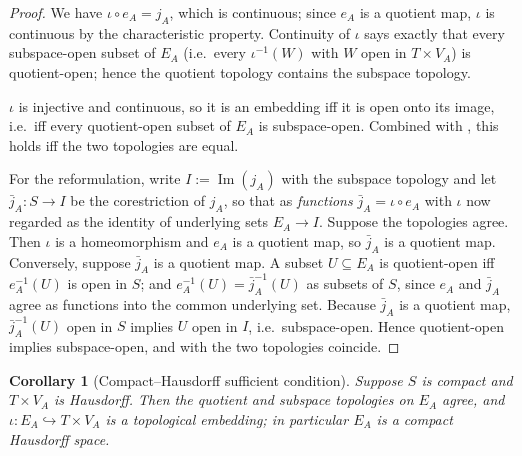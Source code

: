 \documentclass[11pt,reqno]{amsart}
\theoremstyle{plain}
\newtheorem{corollary}[theorem]{Corollary}
\theoremstyle{definition}
\theoremstyle{remark}
\numberwithin{equation}{section}
\DeclareMathOperator{\Image}{Im}
\begin{document}
\begin{proof}
 We have $\iota\circ e_A=j_A$, which is continuous; since $e_A$ is a quotient
map, $\iota$ is continuous by the characteristic property. Continuity of $\iota$ says exactly that
every subspace-open subset of $E_A$ (i.e.\ every $\iota^{-1}(W)$ with $W$ open in $T\times V_A$) is
quotient-open; hence the quotient topology contains the subspace topology.

 $\iota$ is injective and continuous, so it is an embedding iff it is open
onto its image, i.e.\ iff every quotient-open subset of $E_A$ is subspace-open. Combined with
, this holds iff the two topologies are equal.

For the reformulation, write $I:=\Image(j_A)$ with the subspace topology and let
$\bar j_A\colon S\to I$ be the corestriction of $j_A$, so that as \emph{functions}
$\bar j_A=\iota\circ e_A$ with $\iota$ now regarded as the identity of underlying sets $E_A\to I$.
Suppose the topologies agree. Then $\iota$ is a homeomorphism and $e_A$ is a quotient map, so
$\bar j_A$ is a quotient map. Conversely, suppose $\bar j_A$ is a quotient map. A subset $U\subseteq
E_A$ is quotient-open iff $e_A^{-1}(U)$ is open in $S$; and $e_A^{-1}(U)=\bar j_A^{-1}(U)$ as subsets
of $S$, since $e_A$ and $\bar j_A$ agree as functions into the common underlying set. Because
$\bar j_A$ is a quotient map, $\bar j_A^{-1}(U)$ open in $S$ implies $U$ open in $I$, i.e.\
subspace-open. Hence quotient-open implies subspace-open, and with  the two
topologies coincide.
\end{proof}

\begin{corollary}[Compact--Hausdorff sufficient condition]
\label{cor:compact-hausdorff}
Suppose $S$ is compact and $T\times V_A$ is Hausdorff. Then the quotient and subspace topologies on
$E_A$ agree, and $\iota\colon E_A\hookrightarrow T\times V_A$ is a topological embedding; in
particular $E_A$ is a compact Hausdorff space.
\end{corollary}
\end{document}
